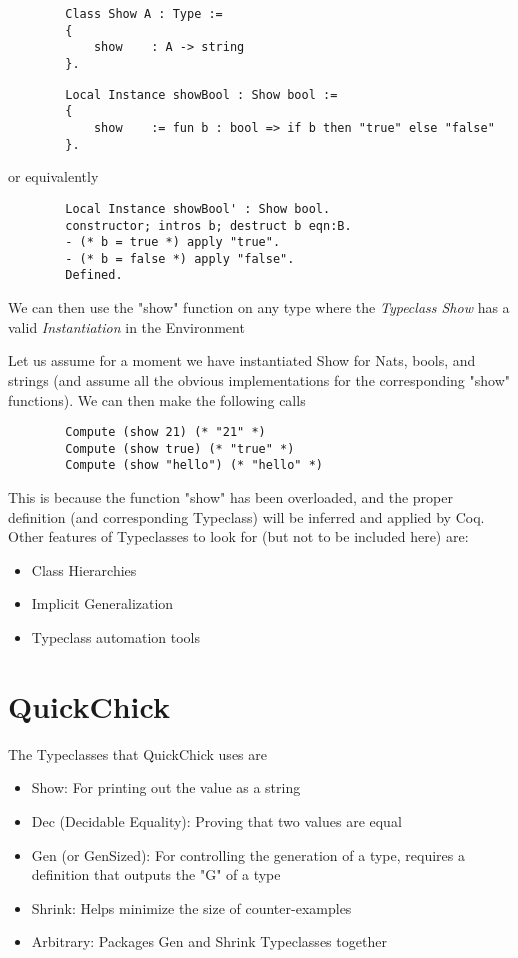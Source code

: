 \documentclass{article}
\begin{document}
    \begin{verbatim}
        Class Show A : Type :=
        {
            show    : A -> string
        }.
    \end{verbatim}
    \begin{verbatim}
        Local Instance showBool : Show bool :=
        {
            show    := fun b : bool => if b then "true" else "false"
        }.
    \end{verbatim}
    or equivalently
    \begin{verbatim}        
        Local Instance showBool' : Show bool.
        constructor; intros b; destruct b eqn:B.
        - (* b = true *) apply "true".
        - (* b = false *) apply "false".
        Defined.
    \end{verbatim}
    We can then use the "show" function on any type where the \emph{Typeclass Show} has a valid \emph{Instantiation} in the Environment

    Let us assume for a moment we have instantiated Show for Nats, bools, and strings (and assume all the obvious implementations for the corresponding "show" functions). 
    We can then make the following calls
    \begin{verbatim}
        Compute (show 21) (* "21" *)
        Compute (show true) (* "true" *)
        Compute (show "hello") (* "hello" *)
    \end{verbatim}
    This is because the function "show" has been overloaded, and the proper definition (and corresponding Typeclass)
    will be inferred and applied by Coq. \\
    Other features of Typeclasses to look for (but not to be included here) are:
    \begin{itemize}
        \item Class Hierarchies
        \item Implicit Generalization
        \item Typeclass automation tools
    \end{itemize}

    \section{QuickChick}
    The Typeclasses that QuickChick uses are 
    \begin{itemize}
      \item Show: For printing out the value as a string
      \item Dec (Decidable Equality): Proving that two values are equal
      \item Gen (or GenSized): For controlling the generation of a type, requires a definition that outputs the "G" of a type
      \item Shrink: Helps minimize the size of counter-examples
      \item Arbitrary: Packages Gen and Shrink Typeclasses together
    \end{itemize}
\end{document}
